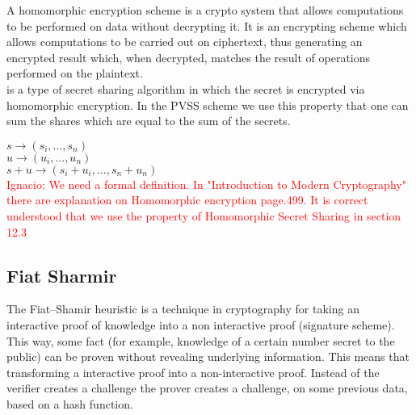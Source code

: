 \noindent 
A homomorphic encryption scheme is a crypto system that allows computations to be performed on data without decrypting it. It is an encrypting scheme which allows computations to be carried out on ciphertext, thus generating an encrypted result which, when decrypted, matches the result of operations performed on the plaintext.\\

 is a type of secret sharing algorithm in which the secret is encrypted via homomorphic encryption. In the PVSS scheme we use this property that one can sum the shares which are equal to the sum of the secrets.

\begin{defi}
\begin{math}s\rightarrow (s_i,...,s_n)\end{math}\\
\begin{math}u\rightarrow (u_i,...,u_n) \end{math}\\
\begin{math}s+u\rightarrow (s_i+u_i,...,s_n+u_n) \end{math}\\
\textcolor{red}{Ignacio: We need a formal definition. In "Introduction to Modern Cryptography" there are explanation on Homomorphic encryption page.499. It is correct understood that we use the property of Homomorphic Secret Sharing in section 12.3 }
\end{defi}


\subsection{Fiat Sharmir}
The Fiat–Shamir heuristic is a technique in cryptography for taking an interactive proof of knowledge into a non interactive proof (signature scheme). This way, some fact (for example, knowledge of a certain number secret to the public) can be proven without revealing underlying information. This means that transforming a interactive proof into a non-interactive proof. Instead of the verifier creates a challenge the prover creates a challenge, on some previous data, based on a hash function.\\

